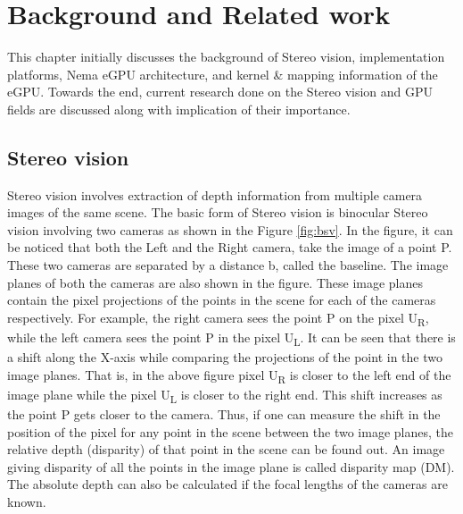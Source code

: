 
\chapter{Background and Related work}
\label{chap:backgroundandrelatedwork}

%
This chapter initially discusses the background of Stereo vision, implementation platforms, Nema eGPU architecture, and kernel \& mapping information of the eGPU. Towards the end, current research done on the Stereo vision and GPU fields are discussed along with implication of their importance.


\section{Stereo vision}
\label{s:stereovision}

Stereo vision involves extraction of depth information from multiple camera images of the same scene. The basic form of Stereo vision is binocular Stereo vision involving two cameras as shown in the Figure \ref{fig:bsv}. In the figure, it can be noticed that both the Left and the Right camera, take the image of a point P. These two cameras are separated by a distance b, called the baseline. The image planes of both the cameras are also shown in the figure. These image planes contain the pixel projections of the points in the scene for each of the cameras respectively. For example, the right camera sees the point P on the pixel U\textsubscript{R}, while the left camera sees the point P in the pixel U\textsubscript{L}. It can be seen that there is a shift along the X-axis while comparing the projections of the point in the two image planes. That is, in the above figure pixel U\textsubscript{R} is closer to the left end of the image plane while the pixel U\textsubscript{L} is closer to the right end.  This shift increases as the point P gets closer to the camera. Thus, if one can measure the shift in the position of the pixel for any point in the scene between the two image planes, the relative depth (disparity) of that point in the scene can be found out. An image giving disparity of all the points in the image plane is called disparity map (DM). The absolute depth can also be calculated if the focal lengths of the cameras are known.\\


